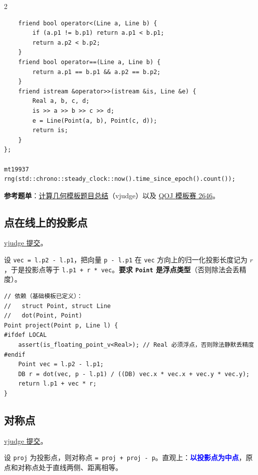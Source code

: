 \begin{multicols*}{2}
\begin{verbatim}
	friend bool operator<(Line a, Line b) {
		if (a.p1 != b.p1) return a.p1 < b.p1;
		return a.p2 < b.p2;
	}
	friend bool operator==(Line a, Line b) {
		return a.p1 == b.p1 && a.p2 == b.p2;
	}
	friend istream &operator>>(istream &is, Line &e) {
		Real a, b, c, d;
		is >> a >> b >> c >> d;
		e = Line(Point(a, b), Point(c, d));
		return is;
	}
};

mt19937 rng(std::chrono::steady_clock::now().time_since_epoch().count());
		\end{verbatim}

		\textbf{参考题单}：\href{https://vjudge.net/article/12247}{计算几何模板题目总结}（vjudge）以及 \href{https://qoj.ac/contest/2646}{QOJ 模板赛 2646}。

		\subsection{点在线上的投影点}

		\href{https://vjudge.net/solution/64166651}{vjudge 提交}。

		设 \texttt{vec = l.p2 - l.p1}，把向量 \texttt{p - l.p1} 在 \texttt{vec} 方向上的归一化投影长度记为 $r$，于是投影点等于 \texttt{l.p1 + r * vec}。\textbf{要求 \texttt{Point} 是浮点类型}（否则除法会丢精度）。

		\begin{verbatim}
// 依赖（基础模板已定义）：
//   struct Point, struct Line
//   dot(Point, Point)
Point project(Point p, Line l) {
#ifdef LOCAL
	assert(is_floating_point_v<Real>); // Real 必须浮点，否则除法静默丢精度
#endif
	Point vec = l.p2 - l.p1;
	DB r = dot(vec, p - l.p1) / ((DB) vec.x * vec.x + vec.y * vec.y);
	return l.p1 + vec * r;
}
		\end{verbatim}

		\subsection{对称点}

		\href{https://vjudge.net/solution/64168723}{vjudge 提交}。

		设 \texttt{proj} 为投影点，则对称点 \texttt{= proj + proj - p}。直观上：\textcolor{blue}{\textbf{以投影点为中点}}，原点和对称点处于直线两侧、距离相等。


\end{multicols*}
